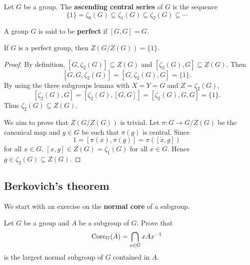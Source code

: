 \begin{definition}
Let $G$ be a group. The \textbf{ascending central series} of $G$ 
is the sequence 
\[
\{1\}=\zeta_0(G)\subseteq\zeta_1(G)\subseteq\zeta_2(G)\subseteq\cdots
\]
\end{definition}

\begin{definition}
A group $G$ is said to be \textbf{perfect} if $[G,G]=G$.
\end{definition}

\begin{theorem}[Gr\"un]
\label{thm:Grun}
If $G$ is a perfect group, then $Z(G/Z(G))=\{1\}$. 
\end{theorem}

\begin{proof}
    By definition, $[G,\zeta_2(G)]\subseteq Z(G)$ and 
    $[\zeta_2(G),G]\subseteq Z(G)$. Then 
    \[
    [G,G,\zeta_2(G)]=[G,\zeta_2(G),G]=\{1\}.
    \]
    By using the three subgroups lemma with $X=Y=G$ and $Z=\zeta_2(G)$, 
    \[
    [\zeta_2(G),G]=[\zeta_2(G),[G,G]]=[\zeta_2(G),G,G]=\{1\}.
    \]
    Thus $\zeta_2(G)\subseteq Z(G)$. 
    
    We aim to prove that $Z(G/Z(G))$ is trivial. Let $\pi\colon G\to G/Z(G)$ be the canonical map and 
    $g\in G$ be such that $\pi(g)$ is central. Since 
    \[
    1=[\pi(x),\pi(g)]=\pi([x,g])
    \]
    for all $x\in G$, $[x,g]\in Z(G)=\zeta_1(G)$ for all $x\in G$. Hence 
    $g\in\zeta_2(G)\subseteq Z(G)$. 
\end{proof}

\subsection{Berkovich's theorem}

We start with an exercise on the \textbf{normal core} of a subgroup. 

\begin{exercise}
\label{xca:core}
	Let $G$ be a group and $A$ be a subgroup of $G$. Prove that
	\[
    \operatorname{Core}_{G}(A)=\bigcap_{x\in G}xAx^{-1}
    \]
    is the largest normal subgroup of $G$ contained in $A$. 
\end{exercise}



